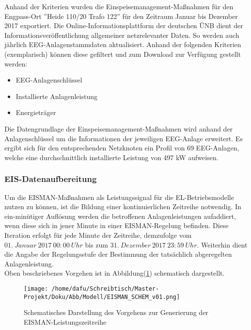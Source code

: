 \documentclass[onecolumn,10pt,titlepage]{article}
\begin{document}
Anhand der Kriterien wurden die Einspeisemanagement-Maßnahmen für den Engpass-Ort ''Heide 110/20 Trafo 122'' für den Zeitraum Januar bis Dezember 2017 exportiert.\newline
Die Online-Informationsplattform der deutschen ÜNB \cite{TennetTSOGmbH50hertzTransmissionGmbHAmprionGmbHTransnetBWGmbH.31.Januar2019} dient der Informationsveröffentlichung allgemeiner netzrelevanter Daten. So werden auch jährlich EEG-Anlagenstammdaten aktualisiert. Anhand der folgenden Kriterien (exemplarisch) können diese gefiltert und zum Download zur Verfügung gestellt werden: %
\begin{itemize} 
	\item EEG-Anlagenschlüssel
	\item Installierte Anlagenleistung
	\item Energieträger
\end{itemize}

Die Datengrundlage der Einspeisemanagement-Maßnahmen wird anhand der Anlagenschlüssel um die Informationen der jeweiligen EEG-Anlage erweitert. Es ergibt sich für den entsprechenden Netzknoten ein Profil von 69 EEG-Anlagen, welche eine durchschnittlich installierte Leistung von 497 kW aufweisen.
\subsubsection{EIS-Datenaufbereitung}
Um die EISMAN-Maßnahmen als Leistungssignal für die EL-Betriebsmodelle nutzen zu können, ist die Bildung einer kontinuierlichen Zeitreihe notwendig. In ein-minütiger Auflösung werden die betroffenen Anlagenleistungen aufaddiert, wenn diese sich in jener Minute in einer EISMAN-Regelung befinden. Diese Iteration erfolgt für jede Minute der Zeitreihe, demzufolge vom $01. ~Januar ~2017 ~00:00 ~Uhr$ bis zum $31.~ Dezember~ 2017 ~23:59~ Uhr$. Weiterhin dient die Angabe der Regelungsstufe der Bestimmung der tatsächlich abgeregelten Anlagenleistung. \\
Oben beschriebenes Vorgehen ist in Abbildung(\ref{fig:EISMAN-Generierung}) schematisch dargestellt.
\begin{figure}[H]
	\centering
	\texttt{[image: /home/dafu/Schreibtisch/Master-Projekt/Doku/Abb/Modell/EISMAN\_SCHEM\_v01.png]}
	\caption[Schema: EISMAN-ZEitreihen GEnerierung]{Schematisches Darstellung des Vorgehens zur Generierung der EISMAN-Leistungszeitreihe}
	\label{fig:EISMAN-Generierung}
\end{figure}
\end{document}
